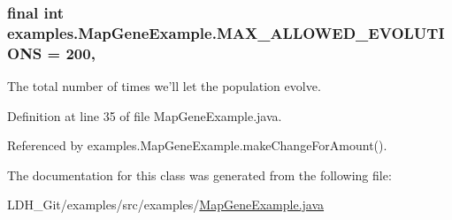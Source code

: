 \hypertarget{classexamples_1_1_map_gene_example_a7504a010ffefd4d9df37d3e8c96b0c1a}{
\subsubsection[{M\-A\-X\-\_\-\-A\-L\-L\-O\-W\-E\-D\-\_\-\-E\-V\-O\-L\-U\-T\-I\-O\-N\-S}]{\setlength{\rightskip}{0pt plus 5cm}final int examples.\-Map\-Gene\-Example.\-M\-A\-X\-\_\-\-A\-L\-L\-O\-W\-E\-D\-\_\-\-E\-V\-O\-L\-U\-T\-I\-O\-N\-S = 200\hspace{0.3cm}{\ttfamily [static]}, {\ttfamily [private]}}}\label{classexamples_1_1_map_gene_example_a7504a010ffefd4d9df37d3e8c96b0c1a}
The total number of times we'll let the population evolve. 

Definition at line 35 of file Map\-Gene\-Example.\-java.



Referenced by examples.\-Map\-Gene\-Example.\-make\-Change\-For\-Amount().



The documentation for this class was generated from the following file\-:\begin{DoxyCompactItemize}
\item 
L\-D\-H\-\_\-\-Git/examples/src/examples/\hyperlink{_map_gene_example_8java}{Map\-Gene\-Example.\-java}\end{DoxyCompactItemize}
